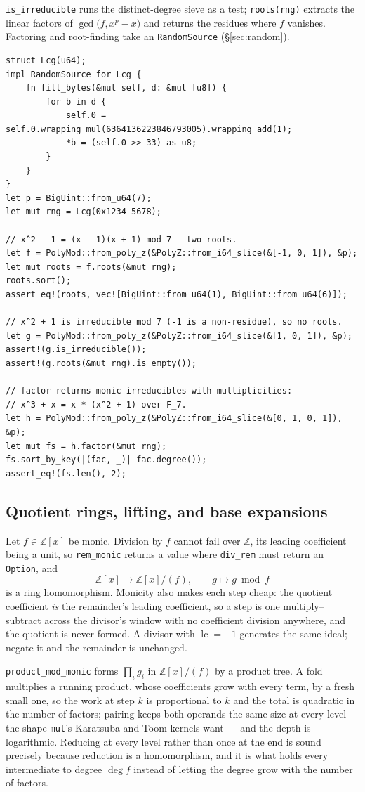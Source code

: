 \documentclass[11pt]{article}
\newcommand{\code}[1]{\texttt{#1}}
\newcommand{\Z}{\mathbb{Z}}
\newcommand{\lc}{\operatorname{lc}}
\begin{document}
\code{is\_irreducible} runs the distinct-degree sieve as a test;
\code{roots(rng)} extracts the linear factors of
$\gcd\bigl(f, x^p - x\bigr)$ and returns the residues where $f$ vanishes.
Factoring and root-finding take an \code{RandomSource} (\S\ref{sec:random}).

\begin{lstlisting}
struct Lcg(u64);
impl RandomSource for Lcg {
    fn fill_bytes(&mut self, d: &mut [u8]) {
        for b in d {
            self.0 = self.0.wrapping_mul(6364136223846793005).wrapping_add(1);
            *b = (self.0 >> 33) as u8;
        }
    }
}
let p = BigUint::from_u64(7);
let mut rng = Lcg(0x1234_5678);

// x^2 - 1 = (x - 1)(x + 1) mod 7 - two roots.
let f = PolyMod::from_poly_z(&PolyZ::from_i64_slice(&[-1, 0, 1]), &p);
let mut roots = f.roots(&mut rng);
roots.sort();
assert_eq!(roots, vec![BigUint::from_u64(1), BigUint::from_u64(6)]);

// x^2 + 1 is irreducible mod 7 (-1 is a non-residue), so no roots.
let g = PolyMod::from_poly_z(&PolyZ::from_i64_slice(&[1, 0, 1]), &p);
assert!(g.is_irreducible());
assert!(g.roots(&mut rng).is_empty());

// factor returns monic irreducibles with multiplicities:
// x^3 + x = x * (x^2 + 1) over F_7.
let h = PolyMod::from_poly_z(&PolyZ::from_i64_slice(&[0, 1, 0, 1]), &p);
let mut fs = h.factor(&mut rng);
fs.sort_by_key(|(fac, _)| fac.degree());
assert_eq!(fs.len(), 2);
\end{lstlisting}

\subsection{Quotient rings, lifting, and base expansions}

Let $f \in \Z[x]$ be monic. Division by $f$ cannot fail over $\Z$, its
leading coefficient being a unit, so \code{rem\_monic} returns a value
where \code{div\_rem} must return an \code{Option}, and
\[
  \Z[x] \longrightarrow \Z[x]/(f), \qquad g \longmapsto g \bmod f
\]
is a ring homomorphism. Monicity also makes each step cheap: the quotient
coefficient \emph{is} the remainder's leading coefficient, so a step is one
multiply--subtract across the divisor's window with no coefficient division
anywhere, and the quotient is never formed. A divisor with $\lc = -1$
generates the same ideal; negate it and the remainder is unchanged.

\code{product\_mod\_monic} forms $\prod_i g_i$ in $\Z[x]/(f)$ by a product
tree. A fold multiplies a running product, whose coefficients grow with
every term, by a fresh small one, so the work at step $k$ is proportional
to $k$ and the total is quadratic in the number of factors; pairing keeps
both operands the same size at every level --- the shape \code{mul}'s
Karatsuba and Toom kernels want --- and the depth is logarithmic.
Reducing at every level rather than once at the end is sound precisely
because reduction is a homomorphism, and it is what holds every
intermediate to degree $\deg f$ instead of letting the degree grow with
the number of factors.
\end{document}
